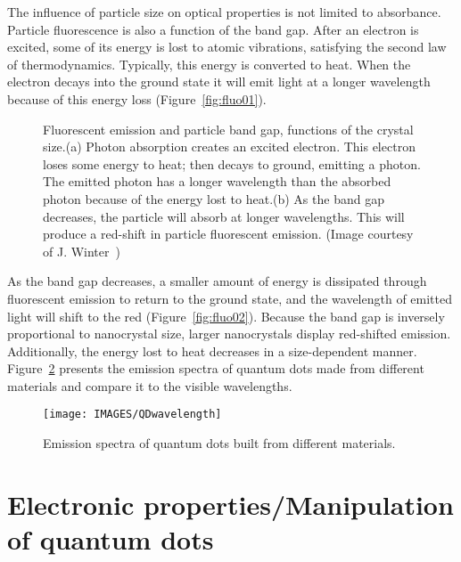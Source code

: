 The influence of particle size on optical properties is not limited to absorbance. Particle fluorescence is also a function of the band gap. After an electron is excited, some of its energy is lost to atomic vibrations, satisfying the second law of thermodynamics. Typically, this energy is converted to heat. When the electron decays into the ground state it will emit light at a longer wavelength because of this energy loss (Figure~\ref{fig:fluo01}). 
\begin{figure} 
 \centering

 \caption{Fluorescent emission and particle band gap, functions of the crystal size.\newline (a) Photon absorption creates an excited electron. This electron loses some energy to heat; then decays to ground, emitting a photon. The emitted photon has a longer wavelength than the absorbed photon because of the energy lost to heat.\newline (b) As the band gap decreases, the particle will absorb at longer wavelengths. This will produce a red-shift in particle fluorescent emission. (Image courtesy of J. Winter~\cite{Winter2004})}
 \label{fig:fluoresence}
\end{figure}
As the band gap decreases, a smaller amount of energy is dissipated through fluorescent emission to return to the ground state, and the wavelength of emitted light will shift to the red (Figure~\ref{fig:fluo02}). Because the band gap is inversely proportional to nanocrystal size, larger nanocrystals display red-shifted emission. Additionally, the energy lost to heat decreases in a size-dependent manner. Figure~\ref{fig:QDwavelength} presents the emission spectra of quantum dots made from different materials and compare it to the visible wavelengths.

 
\begin{figure}
 \centering
 \texttt{[image: IMAGES/QDwavelength]}
 \caption{Emission spectra of quantum dots built from different materials.}
 \label{fig:QDwavelength}
\end{figure}

\section{Electronic properties/Manipulation of quantum dots}

